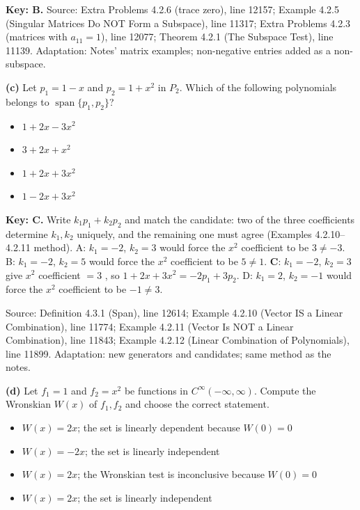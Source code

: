 \documentclass[11pt,a4paper]{article}
\newcommand{\Src}[1]{{\footnotesize\color{black!65}Source: #1}}
\begin{document}
\textbf{Key: B.} \Src{Extra Problems 4.2.6 (trace zero), line 12157; Example 4.2.5 (Singular Matrices Do NOT Form a Subspace), line 11317; Extra Problems 4.2.3 (matrices with $a_{11}=1$), line 12077; Theorem 4.2.1 (The Subspace Test), line 11139. Adaptation: Notes' matrix examples; non-negative entries added as a non-subspace.}\par
{}\textbf{(c)} Let $p_1=1-x$ and $p_2=1+x^{2}$ in $P_2$. Which of the following polynomials belongs to $\operatorname{span}\{p_1,p_2\}$?\par
\begin{itemize}[leftmargin=8mm,itemsep=0pt]\item[A] $1+2x-3x^{2}$\item[B] $3+2x+x^{2}$\item[C$^{\ast}$] $1+2x+3x^{2}$\item[D] $1-2x+3x^{2}$\end{itemize}
\textbf{Key: C.} Write $k_1p_1+k_2p_2$ and match the candidate: two of the three coefficients determine $k_1,k_2$ uniquely, and the remaining one must agree (Examples 4.2.10--4.2.11 method). A: $k_1=-2$, $k_2=3$ would force the $x^{2}$ coefficient to be $3\neq-3$. B: $k_1=-2$, $k_2=5$ would force the $x^{2}$ coefficient to be $5\neq1$. \textbf{C}: $k_1=-2$, $k_2=3$ give $x^{2}$ coefficient $=3$ \checkmark, so $1+2x+3x^{2}=-2p_1+3p_2$. D: $k_1=2$, $k_2=-1$ would force the $x^{2}$ coefficient to be $-1\neq3$.\par
\Src{Definition 4.3.1 (Span), line 12614; Example 4.2.10 (Vector IS a Linear Combination), line 11774; Example 4.2.11 (Vector Is NOT a Linear Combination), line 11843; Example 4.2.12 (Linear Combination of Polynomials), line 11899. Adaptation: new generators and candidates; same method as the notes.}\par
{}\textbf{(d)} Let $f_1=1$ and $f_2=x^{2}$ be functions in $C^{\infty}(-\infty,\infty)$. Compute the Wronskian $W(x)$ of $f_1,f_2$ and choose the correct statement.\par
\begin{itemize}[leftmargin=8mm,itemsep=0pt]\item[A] $W(x)=2x$; the set is linearly dependent because $W(0)=0$\item[B] $W(x)=-2x$; the set is linearly independent\item[C] $W(x)=2x$; the Wronskian test is inconclusive because $W(0)=0$\item[D$^{\ast}$] $W(x)=2x$; the set is linearly independent\end{itemize}
\end{document}
